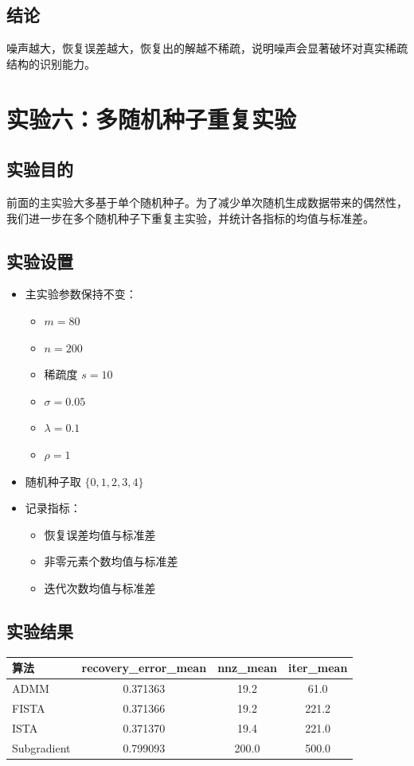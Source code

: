 \documentclass[12pt,a4paper]{ctexart}
\begin{document}
\subsection{结论}
噪声越大，恢复误差越大，恢复出的解越不稀疏，说明噪声会显著破坏对真实稀疏结构的识别能力。

\section{实验六：多随机种子重复实验}
\subsection{实验目的}
前面的主实验大多基于单个随机种子。为了减少单次随机生成数据带来的偶然性，我们进一步在多个随机种子下重复主实验，并统计各指标的均值与标准差。

\subsection{实验设置}
\begin{itemize}[leftmargin=2em]
    \item 主实验参数保持不变：
    \begin{itemize}[leftmargin=2em]
        \item $m=80$
        \item $n=200$
        \item 稀疏度 $s=10$
        \item $\sigma=0.05$
        \item $\lambda=0.1$
        \item $\rho=1$
    \end{itemize}
    \item 随机种子取 $\{0,1,2,3,4\}$
    \item 记录指标：
    \begin{itemize}[leftmargin=2em]
        \item 恢复误差均值与标准差
        \item 非零元素个数均值与标准差
        \item 迭代次数均值与标准差
    \end{itemize}
\end{itemize}

\subsection{实验结果}
\begin{center}
\begin{tabular}{lccc}
\toprule
算法 & recovery\_error\_mean & nnz\_mean & iter\_mean \\
\midrule
ADMM & 0.371363 & 19.2 & 61.0 \\
FISTA & 0.371366 & 19.2 & 221.2 \\
ISTA & 0.371370 & 19.4 & 221.0 \\
Subgradient & 0.799093 & 200.0 & 500.0 \\
\bottomrule
\end{tabular}
\end{center}
\end{document}
